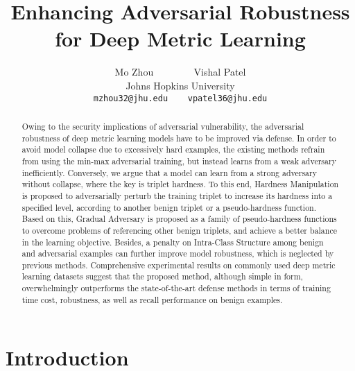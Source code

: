 \documentclass[10pt,twocolumn,letterpaper]{article}
\begin{document}
\title{Enhancing Adversarial Robustness for Deep Metric Learning}

\author{Mo Zhou ~~~~~~~ Vishal Patel\\
Johns Hopkins University\\
{\tt\small mzhou32@jhu.edu ~~ vpatel36@jhu.edu}
}
\maketitle

\begin{abstract}
	Owing to the security implications of adversarial vulnerability, the
	adversarial robustness of deep metric learning models have to be improved
	via defense.
	In order to avoid model collapse due to excessively hard examples, the
	existing methods refrain from using the min-max adversarial training, but
	instead learns from a weak adversary inefficiently.
	Conversely, we argue that a model can learn from a strong adversary without
	collapse, where the key is triplet hardness.
	To this end, Hardness Manipulation is proposed to adversarially perturb the
	training triplet to increase its hardness into a specified level, according
	to another benign triplet or a pseudo-hardness function.
	Based on this, Gradual Adversary is proposed as a family of pseudo-hardness
	functions to overcome problems of referencing other benign triplets, and
	achieve a better balance in the learning objective.
	Besides, a penalty on Intra-Class Structure among benign and adversarial
	examples can further improve model robustness, which is neglected by
	previous methods.
	Comprehensive experimental results on commonly used deep metric
	learning datasets suggest that the proposed method, although simple in
	form, overwhelmingly outperforms the state-of-the-art defense methods in
	terms of training time cost, robustness, as well as recall performance on
	benign examples.
%
\end{abstract}

\section{Introduction}
\label{sec:1}
\end{document}
